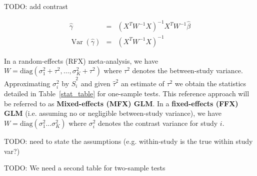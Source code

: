 \documentclass[preprint,12pt]{elsarticle}
\DeclareMathOperator{\Var}{Var}
\newcommand{\effectvector}{\hat\beta}
\newcommand{\vareffect}[1][i]{\hat S^2_{#1}}
\newcommand{\nStudies}{K}
\newcommand{\metaanalyticeffect}{\gamma}
\newcommand{\varBetween}{\tau^2}
\newcommand{\estvarBetween}{\hat\tau^2}
\newcommand{\varWithin}[1][i]{\sigma^2_{#1}}
\newcommand{\transpose}{^T}
\begin{document}
TODO: add contrast

\begin{eqnarray}
	\hat \metaanalyticeffect  &=& (X\transpose W^{-1} X)^{-1} X\transpose W^{-1} \effectvector \\
	\Var(\hat \metaanalyticeffect)  &=& (X\transpose W^{-1} X)^{-1}
	\label{eq_WLS}
\end{eqnarray}

In a random-effects (RFX) meta-analysis, we have $W = \mathrm{diag}( \varWithin[1] + \varBetween, \ldots ,\varWithin[\nStudies] + \varBetween )$ where $\varBetween$ denotes the between-study variance. Approximating $\varWithin$ by $\vareffect$ and given $\estvarBetween$ an estimate of $\varBetween$ we obtain the statistics detailed in Table~\ref{stat_table} for one-sample tests. This reference approach will be referred to as \textbf{Mixed-effects (MFX) GLM}.
In a \textbf{fixed-effects (FFX) GLM} (i.e. assuming no or negligible between-study variance), we have $W = \mathrm{diag}( \varWithin[1] \ldots \varWithin[\nStudies] )$ where $\varWithin$ denotes the contrast variance for study $i$. 

TODO: need to state the assumptions (e.g. within-study is the true within study var?)

TODO: We need a second table for two-sample tests
\end{document}
